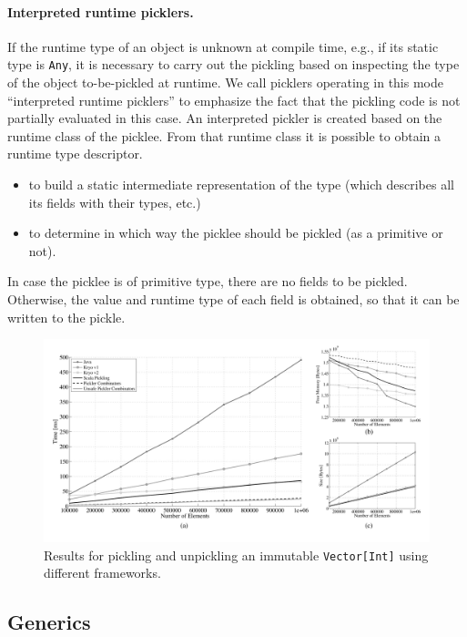 \documentclass[preprint,10pt]{sigplanconf}
\theoremstyle{definition}
\theoremstyle{definition}
\newcommand{\todo}{{\bf \colorbox{red}{\color{white}TODO:}}}
\newcommand{\term}[1]{\mbox{\texttt{#1}}}
\begin{document}
\paragraph{Interpreted runtime picklers.} If the runtime type of an object is
unknown at compile time, e.g., if its static type is \term{Any}, it is
necessary to carry out the pickling based on inspecting the type of the object
to-be-pickled at runtime. We call picklers operating in this mode ``interpreted
runtime picklers'' to emphasize the fact that the pickling code is not
partially evaluated in this case. An interpreted pickler is created based on
the runtime class of the picklee. From that runtime class it is possible to
obtain a runtime type descriptor.

\begin{itemize}
\item to build a static intermediate representation of the type (which describes all its fields with their types, etc.)
\item to determine in which way the picklee should be pickled (as a primitive or not).
\end{itemize}

In case the picklee is of primitive type, there are no fields to be pickled.
Otherwise, the value and runtime type of each field is obtained, so that it
can be written to the pickle.



\begin{figure}[ht!]
 \centering
 \includegraphics[width=\textwidth]{vector.pdf}
 \caption{Results for pickling and unpickling an immutable
   \texttt{Vector[Int]} using different frameworks.}
 \label{fig:results-vector}
\end{figure}

\subsection{Generics}
\end{document}
